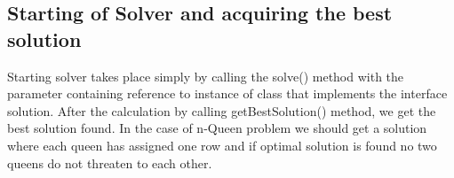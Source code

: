 \subsection{Starting of Solver and acquiring the best solution}
Starting solver takes place simply by calling the solve() method with the parameter containing reference to instance of class that implements the interface solution. After the calculation by calling getBestSolution() method, we get the best solution found. In the case of n-Queen problem we should get a solution where each queen has assigned one row and if optimal solution is found no two queens do not threaten to each other.

